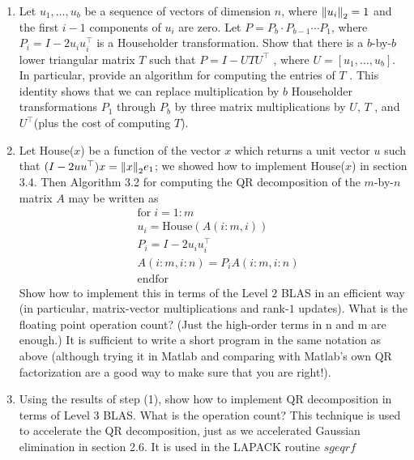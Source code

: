 \documentclass[a4paper]{ctexart}
\newcommand{\pf}{\textbf{\color{pink}{proof:}}}
\begin{document}
\begin{enumerate}
    \item Let $u_1, \ldots , u_b$ be a sequence of vectors of dimension $n$, where ${\norm{u_i}}_2 = 1$
    and the first $i - 1$ components of $u_i$ are zero. Let $P = P_b \cdot P_{b-1} \cdots P_1$,
    where $P_i = I - 2u_iu^\top_i$ is a Householder transformation. Show that there
    is a $b$-by-$b$ lower triangular matrix $T$ such that $P = I - UTU^\top$ , where
    $U = [u_1, \ldots , u_b]$. In particular, provide an algorithm for computing the
    entries of $T$ . This identity shows that we can replace multiplication by $b$
    Householder transformations $P_1$ through $P_b$ by three matrix multiplications by $U$,
    $T$ , and $U^\top$(plus the cost of computing $T$).
    \item Let House($x$) be a function of the vector $x$ which returns a unit vector $u$
    such that $(I - 2uu^\top )x = \norm{x}_2e_1$; we showed how to implement House($x$)
    in section 3.4. Then Algorithm 3.2 for computing the QR decomposition
    of the $m$-by-$n$ matrix $A$ may be written as
    \begin{align*}
        &\text{for}\; i = 1 : m\\
        &u_i = \text{House}(A(i : m, i))\\
        &P_i = I - 2u_iu^\top_i\\
        &A(i : m, i : n) = P_i A(i : m, i : n)\\
        &\text{endfor}
    \end{align*}
    Show how to implement this in terms of the Level $2$ BLAS in an efficient
    way (in particular, matrix-vector multiplications and rank-$1$ updates).
    What is the ﬂoating point operation count? (Just the high-order terms
    in n and m are enough.) It is sufficient to write a short program in the
    same notation as above (although trying it in Matlab and comparing
    with Matlab's own QR factorization are a good way to make sure that
    you are right!).
    \item Using the results of step (1), show how to implement QR decomposition
    in terms of Level $3$ BLAS. What is the operation count? This technique is
    used to accelerate the QR decomposition, just as we accelerated Gaussian
    elimination in section 2.6. It is used in the LAPACK routine $sgeqrf$
    
\end{enumerate}

\pf
\end{document}
